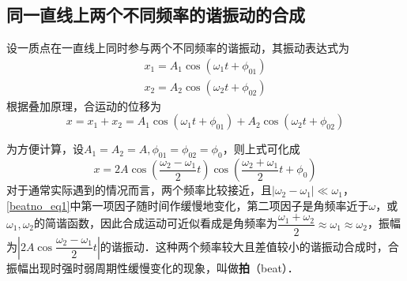 

\subsection{同一直线上两个不同频率的谐振动的合成}

设一质点在一直线上同时参与两个不同频率的谐振动，其振动表达式为
\begin{equation}
\begin{array}{l}x_{1}=A_{1} \cos \left(\omega_{1} t+\phi_{01}\right) \\ x_{2}=A_{2} \cos \left(\omega_{2} t+\phi_{02}\right)\end{array}
\end{equation}
根据叠加原理，合运动的位移为
\begin{equation}
x=x_{1}+x_{2}=A_{1} \cos \left(\omega_{1} t+\phi_{01}\right)+A_{2} \cos \left(\omega_{2} t+\phi_{02}\right)
\end{equation}

为方便计算，设$A_1=A_2=A,\phi_{01}=\phi_{02}=\phi_{0}$，则上式可化成
\begin{equation} \label{beatno_eq1}
x=2 A \cos \left(\frac{\omega_{2}-\omega_{1}}{2} t\right) \cos \left(\frac{\omega_{2}+\omega_{1}}{2} t+\phi_{0}\right)
\end{equation}
对于通常实际遇到的情况而言，两个频率比较接近，且$\left|\omega_{2}-\omega_{1}\right|\ll \omega_1$，\autoref{beatno_eq1}中第一项因子随时间作缓慢地变化，第二项因子是角频率近于$\omega$，或$\omega_1,\omega_2$的简谐函数，因此合成运动可近似看成是角频率为$\dfrac{\omega_{1}+\omega_{2}}{2} \approx \omega_{1} \approx \omega_{2}$，振幅为$\left | 2 A \cos \dfrac{\omega_{2}-\omega_{1}}{2} t\right |$的谐振动．这种两个频率较大且差值较小的谐振动合成时，合振幅出现时强时弱周期性缓慢变化的现象，叫做\textbf{拍}（beat）．

